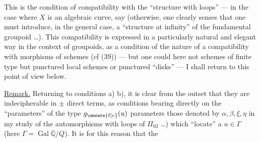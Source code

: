 This is the condition of compatibility with the ``structure with loops'' --- in the case where $X$ is an algebraic curve, say (otherwise, one clearly senses that one must introduce, in the general case, a ``structure at infinity'' of the fundamental groupoid \ldots). \margin{$\Vert$} This compatibility  is expressed in a particularly natural and elegant way in the context of groupoids, \unsure{$\{$} as a condition of the nature of a compatibility with morphisms of schemes (cf (39)) --- but one could here not schemes of finite type but punctured local schemes or punctured ``disks'' --- I shall return to this point of view below.

\uline{Remark.} Returning to conditions a) b), it is clear from the outset that they are indecipherable  in $\pm$ direct terms, as conditions bearing directly on the ``parameters'' of the type $g_{\unsure{\ell|e}}(u)$ \unsure{$\{$|(}parameters   those denoted by $\alpha,\beta,\xi,\eta$ in my study of the automorphisms with loops of $\Pi_{03}$ \ldots) which ``locate'' a $u\in\Gamma$ (here $\Gamma=\operatorname{Gal}\overline{\mathbb{Q}}/Q$).  It is for this reason that the

